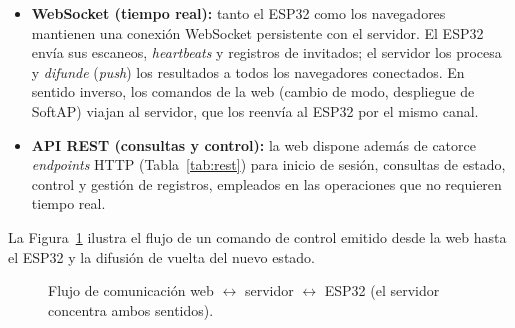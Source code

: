 \begin{itemize}[leftmargin=1.4em]
  \item \textbf{WebSocket (tiempo real):} tanto el ESP32 como los navegadores
  mantienen una conexión WebSocket persistente con el servidor. El ESP32 envía sus
  escaneos, \emph{heartbeats} y registros de invitados; el servidor los procesa y
  \emph{difunde} (\emph{push}) los resultados a todos los navegadores conectados. En
  sentido inverso, los comandos de la web (cambio de modo, despliegue de SoftAP)
  viajan al servidor, que los reenvía al ESP32 por el mismo canal.
  \item \textbf{API REST (consultas y control):} la web dispone además de catorce
  \emph{endpoints} HTTP (Tabla~\ref{tab:rest}) para inicio de sesión, consultas de
  estado, control y gestión de registros, empleados en las operaciones que no
  requieren tiempo real.
\end{itemize}

La Figura~\ref{fig:comunicacion} ilustra el flujo de un comando de control emitido
desde la web hasta el ESP32 y la difusión de vuelta del nuevo estado.

\begin{figure}[H]
\centering
{}
\caption{Flujo de comunicación web $\leftrightarrow$ servidor $\leftrightarrow$ ESP32 (el servidor concentra ambos sentidos).}
\label{fig:comunicacion}
\end{figure}

